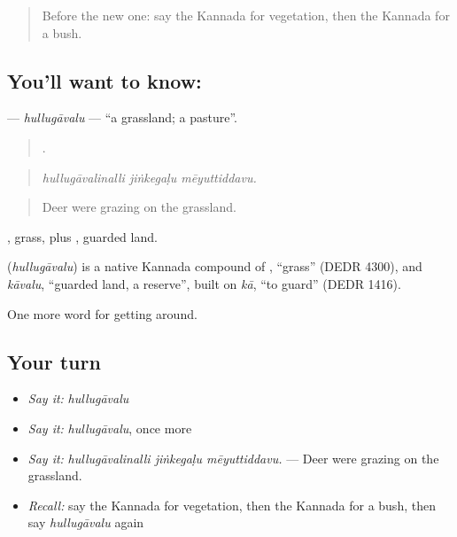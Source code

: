 \label{lesson:KA-C479-hullugavalu}



\begin{quote}
Before the new one: say the Kannada for vegetation, then the Kannada for a bush.
\end{quote}

\subsection*{You'll want to know: }
\textbf{} — \emph{hullugāvalu} — \textquotedblleft{}a grassland; a pasture\textquotedblright{}.

\begin{quote}
  .
\end{quote}

\begin{quote}
\emph{hullugāvalinalli jiṅkegaḷu mēyuttiddavu.}
\end{quote}

\begin{quote}
Deer were grazing on the grassland.
\end{quote}

, grass, plus , guarded land.

\begin{cousinweb}
\textbf{} (\emph{hullugāvalu}) is a native Kannada compound of , \textquotedblleft{}grass\textquotedblright{} (DEDR 4300), and \emph{kāvalu}, \textquotedblleft{}guarded land, a reserve\textquotedblright{}, built on \emph{kā}, \textquotedblleft{}to guard\textquotedblright{} (DEDR 1416).
\end{cousinweb}

\begin{grammarlens}[title={What you've built}]
One more word for getting around.
\end{grammarlens}

\subsection*{Your turn}
\begin{itemize}
\raggedright
  \item \emph{Say it:} \emph{hullugāvalu}
  \item \emph{Say it:} \emph{hullugāvalu}, once more
  \item \emph{Say it:} \emph{hullugāvalinalli jiṅkegaḷu mēyuttiddavu.} — Deer were grazing on the grassland.
  \item \emph{Recall:} say the Kannada for vegetation, then the Kannada for a bush, then say \emph{hullugāvalu} again
\end{itemize}


